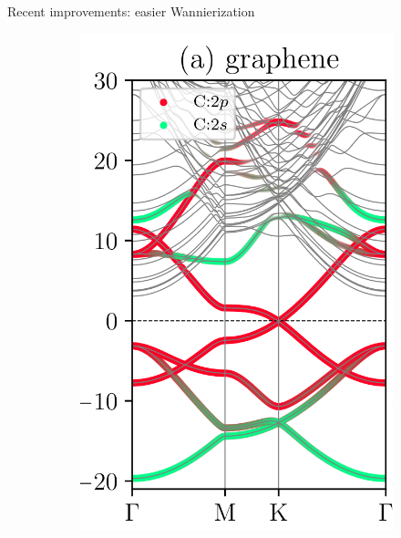 \documentclass[xcolor=table,aspectratio=169]{beamer}
\numberwithin{equation}{section}
\begin{document}
\begin{frame}{Recent improvements: easier Wannierization}
\begin{figure}[t]
\begin{subfigure}{0.225\textwidth}
         \includegraphics[height=1.5\columnwidth]{figures/proj_disentanglement_fig1a.png}
      \end{subfigure}
      \hspace{0.025\textwidth}
      \begin{subfigure}{0.225\textwidth}

\end{subfigure}
\end{figure}
\end{frame}
\end{document}
